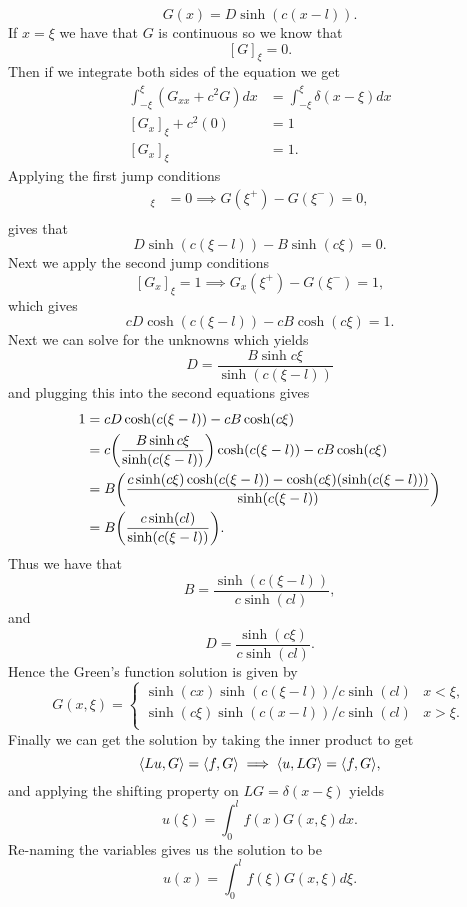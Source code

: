 \documentclass[12pt]{report}
\begin{document}
\begin{solution}
\begin{enumerate}
        \[ 
            G(x) = D\sinh(c(x - l)).
        \]
        If $x = \xi$ we have that $G$ is continuous so we know that 
        \[ 
            [G]_\xi = 0.
        \] 
        Then if we integrate both sides of the equation we get
        \begin{align*}
            \int_{-\xi}^{\xi}(G_{xx} + c^2G)dx &= \int_{-\xi}^{\xi}\delta(x - \xi)dx\\
            [G_x]_\xi + c^2 (0)&= 1\\
            [G_x]_\xi &= 1. 
        \end{align*} 
        Applying the first jump conditions
        \begin{align*}
            [G]_\xi &= 0 \implies G(\xi^+) - G(\xi^-) = 0,\\
        \end{align*}
        gives that
        \[ 
            D\sinh(c(\xi - l)) - B\sinh(c\xi) = 0.
        \]
        Next we apply the second jump conditions
        \[ 
            [G_x]_\xi = 1 \implies G_x(\xi^+) - G(\xi^-) = 1,
        \]
        which gives 
        \[
            cD\cosh(c(\xi-l)) - cB\cosh(c\xi) = 1.
        \]
        Next we can solve for the unknowns which yields
        \[
            D = \frac{B\sinh{c \xi}}{\sinh(c(\xi-l))}
        \]
        and plugging this into the second equations gives
        \begin{align*}
            1 &= cD\cosh(c(\xi-l)) - cB\cosh(c\xi)\\
            &= c{\left(\frac{B\sinh{c \xi}}{\sinh(c(\xi-l))}\right)}\cosh(c(\xi-l)) - cB\cosh(c\xi)\\
            &= B {\left( \frac{c\sinh(c\xi)\cosh(c(\xi-l)) - \cosh(c\xi)(\sinh(c(\xi - l)))}{\sinh(c(\xi -l))}\right)}\\
            &= B {\left(\frac{c\sinh(cl)}{\sinh(c(\xi -l))}\right)}.
        \end{align*}
        Thus we have that
        \[ 
            B = \frac{\sinh(c(\xi - l))}{c\sinh(cl)},
        \]
        and
        \[ 
            D = \frac{\sinh(c\xi)}{c\sinh(cl)}.
        \]
        Hence the Green's function solution is given by
        \[ 
            G(x,\xi) = \begin{cases}
                \sinh(cx)\sinh(c(\xi - l)) / c\sinh(cl) & x < \xi,\\
                \sinh(c\xi)\sinh(c(x - l)) / c\sinh(cl) & x > \xi.\\
            \end{cases}
        \]
        Finally we can get the solution by taking the inner product to get
        \[ 
            {\left\langle Lu,G\right\rangle} = {\left\langle f,G\right\rangle} \implies {\left\langle u,LG\right\rangle} = {\left\langle f,G\right\rangle},
        \]
        and applying the shifting property on $LG = \delta(x - \xi)$ yields
        \[ 
            u(\xi) = \int_0^l f(x)G(x,\xi)dx.
        \]
        Re-naming the variables gives us the solution to be
        \[ 
            u(x) = \int_0^l f(\xi)G(x,\xi)d\xi.
        \]


    \end{enumerate}
\end{solution}
\end{document}
